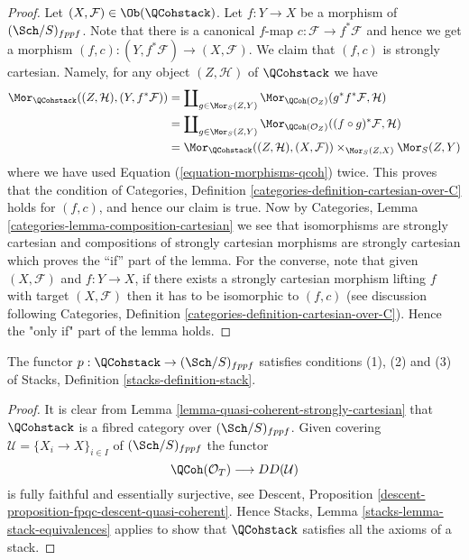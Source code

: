\begin{proof}
Let $(X, \mathcal{F}) \in \Ob(\QCohstack)$.
Let $f : Y \to X$ be a morphism of $(\Sch/S)_{fppf}$.
Note that there is a canonical $f$-map $c : \mathcal{F} \to f^*\mathcal{F}$
and hence we get a morphism
$(f, c) : (Y, f^*\mathcal{F}) \to (X, \mathcal{F})$.
We claim that $(f, c)$ is strongly cartesian.
Namely, for any object $(Z, \mathcal{H})$ of $\QCohstack$ we have
\begin{align*}
\Mor_{\QCohstack}((Z, \mathcal{H}), (Y, f^*\mathcal{F}))
& =
\coprod\nolimits_{g \in \Mor_S(Z, Y)}
\Mor_{\QCoh(\mathcal{O}_Z)}(g^*f^*\mathcal{F}, \mathcal{H}) \\
& =
\coprod\nolimits_{g \in \Mor_S(Z, Y)}
\Mor_{\QCoh(\mathcal{O}_Z)}((f \circ g)^*\mathcal{F}, \mathcal{H}) \\
& =
\Mor_{\QCohstack}((Z, \mathcal{H}), (X, \mathcal{F}))
\times_{\Mor_S(Z, X)} \Mor_S(Z, Y)
\end{align*}
where we have used Equation (\ref{equation-morphisms-qcoh}) twice.
This proves that the condition of
Categories, Definition \ref{categories-definition-cartesian-over-C}
holds for $(f, c)$, and hence our claim is true. Now by
Categories, Lemma \ref{categories-lemma-composition-cartesian}
we see that isomorphisms are strongly cartesian and
compositions of strongly cartesian morphisms are strongly cartesian
which proves the ``if'' part of the lemma. For the converse, note
that given $(X, \mathcal{F})$ and $f : Y \to X$, if there exists a
strongly cartesian morphism lifting $f$ with target $(X, \mathcal{F})$
then it has to be isomorphic to $(f, c)$ (see discussion following
Categories, Definition \ref{categories-definition-cartesian-over-C}).
Hence the "only if" part of the lemma holds.
\end{proof}

\begin{lemma}
\label{lemma-stack-of-quasi-coherent-sheaves}
The functor $p : \QCohstack \to (\Sch/S)_{fppf}$
satisfies conditions (1), (2) and (3) of
Stacks, Definition \ref{stacks-definition-stack}.
\end{lemma}

\begin{proof}
It is clear from
Lemma \ref{lemma-quasi-coherent-strongly-cartesian}
that $\QCohstack$ is a fibred category over $(\Sch/S)_{fppf}$.
Given covering $\mathcal{U} = \{X_i \to X\}_{i \in I}$ of
$(\Sch/S)_{fppf}$ the functor
$$
\QCoh(\mathcal{O}_T) \longrightarrow DD(\mathcal{U})
$$
is fully faithful and essentially surjective, see
Descent, Proposition \ref{descent-proposition-fpqc-descent-quasi-coherent}.
Hence
Stacks, Lemma \ref{stacks-lemma-stack-equivalences}
applies to show that $\QCohstack$ satisfies all the
axioms of a stack.
\end{proof}





